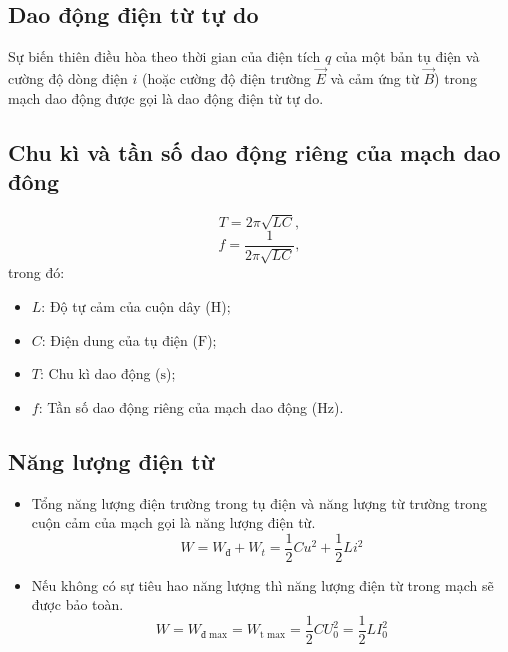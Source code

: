 \subsection {Dao động điện từ tự do}
Sự biến thiên điều hòa theo thời gian của điện tích $q$ của một bản tụ điện và cường độ dòng điện $i$ (hoặc cường độ điện trường $\vec{E}$ và cảm ứng từ $\vec{B}$) trong mạch dao động được gọi là dao động điện từ tự do.
\subsection {Chu kì và tần số dao động riêng của mạch dao đông}
\begin{equation}
	T=2\pi \sqrt {LC},
\end{equation}
\begin{equation}
	f=\frac{1}{2\pi\sqrt {LC}},
\end{equation}
trong đó:
\begin{itemize}
	\item $L$: Độ tự cảm của cuộn dây ($\text{H}$);
	\item $C$: Điện dung của tụ điện ($\text{F}$);
	\item $T$: Chu kì dao động ($\text{s}$);
	\item $f$: Tần số dao động riêng của mạch dao động ($\text{Hz}$).
\end{itemize}
\subsection {Năng lượng điện từ}
\begin{itemize}
	\item Tổng năng lượng điện trường trong tụ điện và năng lượng từ trường trong cuộn cảm của mạch gọi là năng lượng điện từ.\\
	\begin{equation}
		W=W_{\text{đ}}+W_{t}=\frac{1}{2}Cu^2+\frac{1}{2}Li^2
	\end{equation}
	\item Nếu không có sự tiêu hao năng lượng thì năng lượng điện từ trong mạch sẽ được bảo toàn.
	\begin{equation}
		W=W_\text{đ max}=W_\text{t max}=\dfrac{1}{2}CU^2_0=\dfrac{1}{2}LI^2_0
	\end{equation}
\end{itemize}
